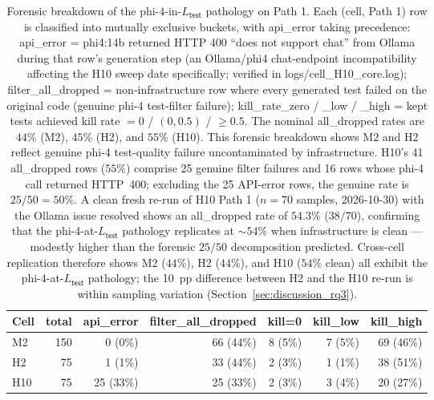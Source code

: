\begin{table}[!htbp]
\centering
\small
\caption{Forensic breakdown of the phi-4-in-$L_{\textsf{test}}$ pathology on Path 1. Each (cell, Path 1) row is classified into mutually exclusive buckets, with \textsf{api\_error} taking precedence: \textsf{api\_error} = phi4:14b returned HTTP 400 ``does not support chat'' from Ollama during that row's generation step (an Ollama/phi4 chat-endpoint incompatibility affecting the H10 sweep date specifically; verified in logs/cell\_H10\_core.log); \textsf{filter\_all\_dropped} = non-infrastructure row where every generated test failed on the original code (genuine phi-4 test-filter failure); \textsf{kill\_rate\_zero} / \textsf{\_low} / \textsf{\_high} = kept tests achieved kill rate $=0$ / $(0, 0.5)$ / $\geq 0.5$. The nominal \textsf{all\_dropped} rates are $44\%$ (M2), $45\%$ (H2), and $55\%$ (H10). This forensic breakdown shows M2 and H2 reflect genuine phi-4 test-quality failure uncontaminated by infrastructure. H10's 41 \textsf{all\_dropped} rows ($55\%$) comprise 25 genuine filter failures and 16 rows whose phi-4 call returned HTTP~400; excluding the 25 API-error rows, the genuine rate is $25/50 = 50\%$. A clean fresh re-run of H10 Path 1 ($n = 70$ samples, 2026-10-30) with the Ollama issue resolved shows an all\_dropped rate of $54.3\%$ ($38/70$), confirming that the phi-4-at-$L_{\textsf{test}}$ pathology replicates at $\sim$$54\%$ when infrastructure is clean --- modestly higher than the forensic $25/50$ decomposition predicted. Cross-cell replication therefore shows M2 ($44\%$), H2 ($44\%$), and H10 ($54\%$ clean) all exhibit the phi-4-at-$L_{\textsf{test}}$ pathology; the 10~pp difference between H2 and the H10 re-run is within sampling variation (Section~\ref{sec:discussion_rq3}).}
\label{tab:phi4_failure_modes}
\begin{tabular}{@{}lrrrrrr@{}}
\toprule
Cell & total & api\_error & filter\_all\_dropped & kill=0 & kill\_low & kill\_high \\
\midrule
M2 & 150 & 0 (0\%) & 66 (44\%) & 8 (5\%) & 7 (5\%) & 69 (46\%) \\
H2 & 75 & 1 (1\%) & 33 (44\%) & 2 (3\%) & 1 (1\%) & 38 (51\%) \\
H10 & 75 & 25 (33\%) & 25 (33\%) & 2 (3\%) & 3 (4\%) & 20 (27\%) \\
\bottomrule
\end{tabular}
\end{table}
